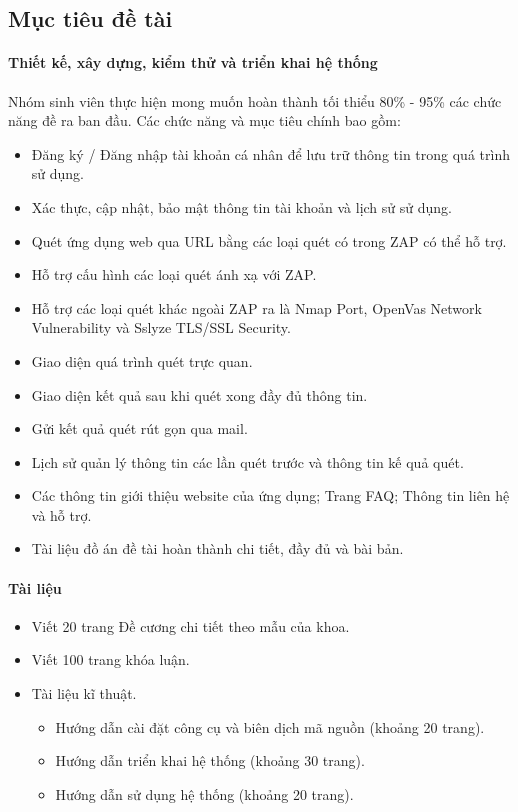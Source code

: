 \subsection{Mục tiêu đề tài}
\paragraph{Thiết kế, xây dựng, kiểm thử và triển khai hệ thống}
\tab Nhóm sinh viên thực hiện mong muốn hoàn thành tối thiểu 80\% - 95\% các chức năng đề ra ban đầu. Các chức năng và mục tiêu chính bao gồm:
\begin{itemize}
    \item Đăng ký / Đăng nhập tài khoản cá nhân để lưu trữ thông tin trong quá trình sử dụng.
    \item Xác thực, cập nhật, bảo mật thông tin tài khoản và lịch sử sử dụng.
    \item Quét ứng dụng web qua URL bằng các loại quét có trong ZAP có thể hỗ trợ.
    \item Hỗ trợ cấu hình các loại quét ánh xạ với ZAP.
    \item Hỗ trợ các loại quét khác ngoài ZAP ra là Nmap Port, OpenVas Network Vulnerability và Sslyze TLS/SSL Security.
    \item Giao diện quá trình quét trực quan.
    \item Giao diện kết quả sau khi quét xong đầy đủ thông tin.
    \item Gửi kết quả quét rút gọn qua mail.
    \item Lịch sử quản lý thông tin các lần quét trước và thông tin kế quả quét.
    \item Các thông tin giới thiệu website của ứng dụng; Trang FAQ; Thông tin liên hệ và hỗ trợ.
    \item Tài liệu đồ án đề tài hoàn thành chi tiết, đầy đủ và bài bản.
\end{itemize}
\paragraph{Tài liệu}
\begin{itemize}
    \item Viết 20 trang Đề cương chi tiết theo mẫu của khoa.
    \item Viết 100 trang khóa luận.
    \item Tài liệu kĩ thuật.
    \begin{itemize}
        \item Hướng dẫn cài đặt công cụ và biên dịch mã nguồn (khoảng 20 trang).
        \item Hướng dẫn triển khai hệ thống (khoảng 30 trang).
        \item Hướng dẫn sử dụng hệ thống (khoảng 20 trang).
    \end{itemize}
\end{itemize}